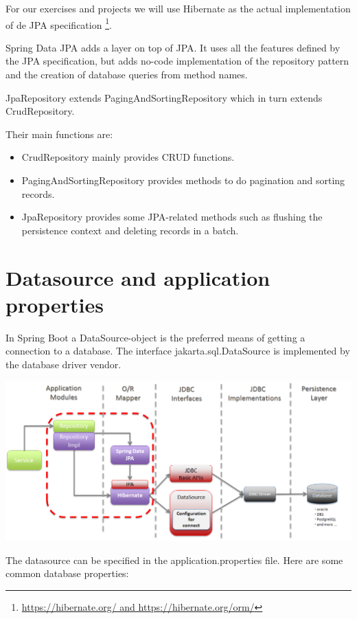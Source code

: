 For our exercises and projects we will use Hibernate as the actual implementation of de JPA specification \footnote{\url{https://hibernate.org/ and https://hibernate.org/orm/}}.  

Spring Data JPA adds a layer on top of JPA. It uses all the features defined by the JPA specification, but adds no-code implementation of the repository pattern and the creation of database queries from method names.

JpaRepository extends PagingAndSortingRepository which in turn extends CrudRepository.

Their main functions are:

\begin{itemize}
\item CrudRepository mainly provides CRUD functions.
\item PagingAndSortingRepository provides methods to do pagination and sorting records.
\item JpaRepository provides some JPA-related methods such as flushing the persistence context and deleting records in a batch.
\end{itemize}


\section{Datasource and application properties}

In Spring Boot a DataSource-object is the preferred means of getting a connection to a database.
The interface jakarta.sql.DataSource is implemented by the database driver vendor. 

\includegraphics[width=\textwidth]{./images/chapter-jpa/springdatajpa}

The datasource can be specified in the application.properties file.
Here are some common database properties:

